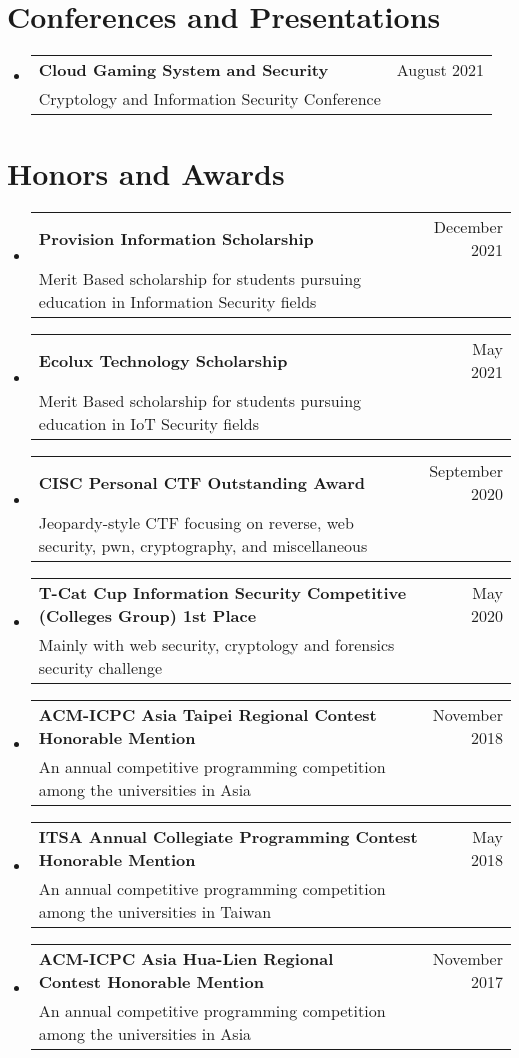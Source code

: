 \documentclass[A4,11pt]{article}
\makeatletter
\newcommand{\CVSubheading}[4]{
  \vspace{-2pt}\item
    \begin{tabular*}{0.97\textwidth}[t]{l@{\extracolsep{\fill}}r}
      \textbf{#1} & #2 \\
      \small#3 & \small #4 \\
    \end{tabular*}\vspace{-7pt}
}
\newcommand{\CVSubHeadingListStart}{\begin{itemize}[leftmargin=0.5cm, label={}]}
\newcommand{\CVSubHeadingListEnd}{\end{itemize}}
\makeatother
\begin{document}
\begin{comment}
Again the title should have already been enough, but if it is necessary to add
descriptions maintain the consistency from prior sections
\end{comment}

\section{Conferences and Presentations}
  \CVSubHeadingListStart
    \CVSubheading
      {Cloud Gaming System and Security}{August 2021}
      {Cryptology and Information Security Conference}{}
  \CVSubHeadingListEnd

\section{Honors and Awards}
  \CVSubHeadingListStart
    \CVSubheading
      {Provision Information Scholarship}{December 2021}
      {Merit Based scholarship for students pursuing education in Information Security fields}{}
    \CVSubheading
      {Ecolux Technology Scholarship}{May 2021}
      {Merit Based scholarship for students pursuing education in IoT Security fields}{}
    \CVSubheading
      {CISC Personal CTF Outstanding Award}{September 2020}
      {Jeopardy-style CTF focusing on reverse, web security, pwn, cryptography, and miscellaneous}{}
    \CVSubheading
      {T-Cat Cup Information Security Competitive (Colleges Group) 1st Place}{May 2020}
      {Mainly with web security, cryptology and forensics security challenge}{}
    \CVSubheading
      {ACM-ICPC Asia Taipei Regional Contest Honorable Mention}{November 2018}
      {An annual competitive programming competition among the universities in Asia}{}
    \CVSubheading
      {ITSA Annual Collegiate Programming Contest Honorable Mention}{May 2018}
      {An annual competitive programming competition among the universities in Taiwan}{}
    \CVSubheading
      {ACM-ICPC Asia Hua-Lien Regional Contest Honorable Mention}{November 2017}
      {An annual competitive programming competition among the universities in Asia}{}
  \CVSubHeadingListEnd

\end{document}
